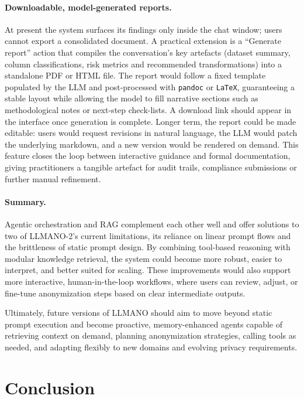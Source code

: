 \documentclass{article}
\begin{document}
\paragraph{Downloadable, model-generated reports.}
At present the system surfaces its findings only inside the chat window; users cannot export a consolidated document.  
A practical extension is a “Generate report” action that compiles the conversation’s key artefacts (dataset summary, column classifications, risk metrics and recommended transformations) into a standalone PDF or HTML file.  
The report would follow a fixed template populated by the LLM and post-processed with \texttt{pandoc} or \texttt{LaTeX}, guaranteeing a stable layout while allowing the model to fill narrative sections such as methodological notes or next-step check-lists.  
A download link should appear in the interface once generation is complete.  
Longer term, the report could be made editable: users would request revisions in natural language, the LLM would patch the underlying markdown, and a new version would be rendered on demand.  
This feature closes the loop between interactive guidance and formal documentation, giving practitioners a tangible artefact for audit trails, compliance submissions or further manual refinement.


\paragraph{Summary.}
Agentic orchestration and RAG complement each other well and offer solutions to two of LLMANO-2’s current limitations, its reliance on linear prompt flows and the brittleness of static prompt design. By combining tool-based reasoning with modular knowledge retrieval, the system could become more robust, easier to interpret, and better suited for scaling. These improvements would also support more interactive, human-in-the-loop workflows, where users can review, adjust, or fine-tune anonymization steps based on clear intermediate outputs.

Ultimately, future versions of LLMANO should aim to move beyond static prompt execution and become proactive, memory-enhanced agents capable of retrieving context on demand, planning anonymization strategies, calling tools as needed, and adapting flexibly to new domains and evolving privacy requirements.


\section{Conclusion}
\label{sec:conclusion}
\end{document}
